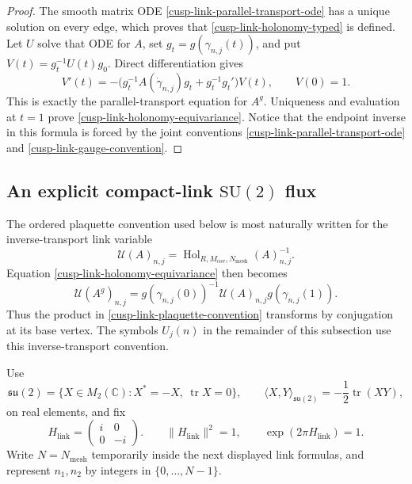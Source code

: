 \begin{proof}
The smooth matrix ODE \eqref{cusp-link-parallel-transport-ode} has a unique
solution on every edge, which proves that \eqref{cusp-link-holonomy-typed}
is defined.  Let \(U\) solve that ODE for \(A\), set
\(g_t=g(\gamma_{n,j}(t))\), and put
\(V(t)=g_t^{-1}U(t)g_0\).  Direct differentiation gives
\[
 V'(t)=-\bigl(g_t^{-1}A(\dot\gamma_{n,j})g_t
                 +g_t^{-1}g_t'\bigr)V(t),
 \qquad V(0)=1.
\]
This is exactly the parallel-transport equation for \(A^g\).  Uniqueness
and evaluation at \(t=1\) prove \eqref{cusp-link-holonomy-equivariance}.
Notice that the endpoint inverse in this formula is forced by the joint
conventions \eqref{cusp-link-parallel-transport-ode} and
\eqref{cusp-link-gauge-convention}.
\end{proof}

\subsection{An explicit compact-link
\texorpdfstring{\(\mathrm{SU}(2)\)}{SU(2)} flux}

The ordered plaquette convention used below is most naturally written for
the inverse-transport link variable
\begin{equation}
 \mathcal U(A)_{n,j}
 =\operatorname{Hol}_{R,M_{\mathrm{cov}},N_{\mathrm{mesh}}}(A)_{n,j}^{-1}.
 \label{cusp-link-inverse-transport-variable}
\end{equation}
Equation \eqref{cusp-link-holonomy-equivariance} then becomes
\begin{equation}
 \mathcal U(A^g)_{n,j}
 =g(\gamma_{n,j}(0))^{-1}\mathcal U(A)_{n,j}g(\gamma_{n,j}(1)).
 \label{cusp-link-inverse-transport-gauge-law}
\end{equation}
Thus the product in \eqref{cusp-link-plaquette-convention} transforms by
conjugation at its base vertex.  The symbols \(U_j(n)\) in the remainder of
this subsection use this inverse-transport convention.

Use
\begin{equation}
 \mathfrak{su}(2)=\{X\in M_2(\mathbb C):X^*=-X,\ \operatorname{tr}X=0\},
 \qquad
 \langle X,Y\rangle_{\mathfrak{su}(2)}
 =-\frac12\operatorname{tr}(XY),
 \label{cusp-link-su2-inner-product}
\end{equation}
on real elements, and fix
\begin{equation}
 H_{\mathrm{link}}=\begin{pmatrix}i&0\\0&-i\end{pmatrix}.
 \qquad
 \lVert H_{\mathrm{link}}\rVert^2=1,
 \qquad \exp(2\pi H_{\mathrm{link}})=1.
 \label{cusp-link-flux-generator}
\end{equation}
Write \(N=N_{\mathrm{mesh}}\) temporarily inside the next displayed link
formulas, and represent \(n_1,n_2\) by integers in
\(\{0,\ldots,N-1\}\).

